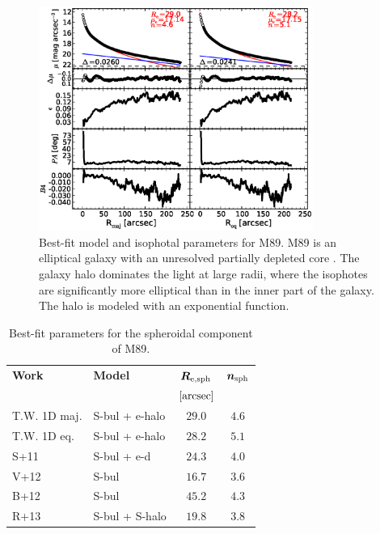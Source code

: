\documentclass[preprint2]{emulateapj}
\newcommand{\fitfigurewidth}{0.8\textwidth}
\begin{document}
  \begin{figure}[h]
  \begin{center}
  \includegraphics[width=\fitfigurewidth]{images/m89_1Dfit.eps}
  \caption{Best-fit model and isophotal parameters for M89.
  M89 is an elliptical galaxy with an unresolved partially depleted core \citep{rusli2013}. 
  The galaxy halo dominates the light at large radii, where the isophotes are significantly more elliptical than in the inner part of the galaxy. 
  The halo is modeled with an exponential function. 
  }
  \end{center}
  \end{figure}

  \begin{table}[h]
  \small
  \caption{Best-fit parameters for the spheroidal component of M89.}
  \begin{center}
  \begin{tabular}{llcc}
  \hline
  {\bf Work} & {\bf Model}   & $\bm R_{\rm e,sph}$    & $\bm n_{\rm sph}$ \\
    &  &  $[\rm arcsec]$ & \\
  \hline
  T.W. 1D maj. & S-bul + e-halo  & $29.0$  &  $4.6$ \\
  T.W. 1D eq.  & S-bul + e-halo  & $28.2$  &  $5.1$ \\
  \hline
  S+11         & S-bul + e-d     & $24.3$  &  $4.0$ \\
  V+12         & S-bul           & $16.7$  &  $3.6$ \\
  B+12         & S-bul           & $45.2$  &  $4.3$ \\
  R+13         & S-bul + S-halo  & $19.8$  &  $3.8$ \\
  \hline
  \end{tabular}
  \end{center}
  \label{tab:m89}
  \end{table}
\end{document}
